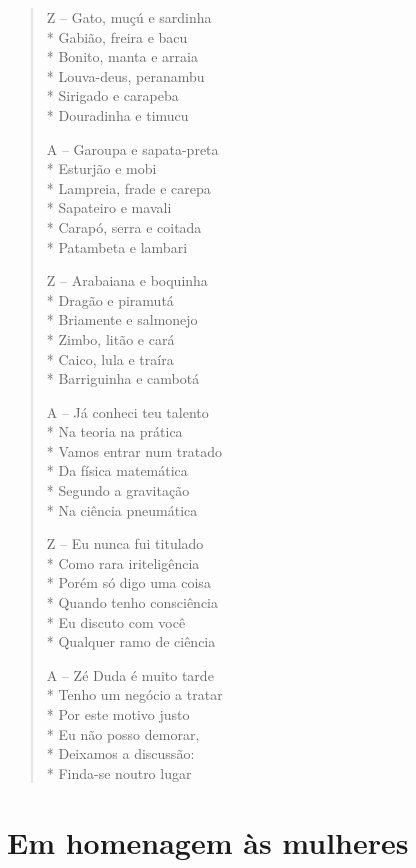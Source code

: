 \begin{verse}
Z -- Gato, muçú e sardinha\\*
Gabião, freira e bacu\\*
Bonito, manta e arraia\\*
Louva-deus, peranambu\\*
Sirigado e carapeba\\*
Douradinha e timucu

A -- Garoupa e sapata-preta\\*
Esturjão e mobi\\*
Lampreia, frade e carepa\\*
Sapateiro e mavali\\*
Carapó, serra e coitada\\*
Patambeta e lambari

Z -- Arabaiana e boquinha\\*
Dragão e piramutá\\*
Briamente e salmonejo\\*
Zimbo, litão e cará\\*
Caico, lula e traíra\\*
Barriguinha e cambotá

A -- Já conheci teu talento\\*
Na teoria na prática\\*
Vamos entrar num tratado\\*
Da física matemática\\*
Segundo a gravitação\\*
Na ciência pneumática

Z -- Eu nunca fui titulado\\*
Como rara iriteligência\\*
Porém só digo uma coisa\\*
Quando tenho consciência\\*
Eu discuto com você\\*
Qualquer ramo de ciência

A -- Zé Duda é muito tarde\\*
Tenho um negócio a tratar\\*
Por este motivo justo\\*
Eu não posso demorar,\\*
Deixamos a discussão:\\*
Finda-se noutro lugar

\end{verse}

\chapter{Em homenagem às mulheres}

